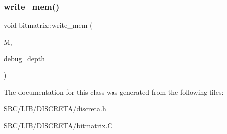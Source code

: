 \subsubsection{\texorpdfstring{write\+\_\+mem()}{write\_mem()}}
{\footnotesize\ttfamily void bitmatrix\+::write\+\_\+mem (\begin{DoxyParamCaption}\item[{\mbox{\hyperlink{classmemory}{memory}} \&}]{M,  }\item[{\mbox{\hyperlink{galois_8h_a09fddde158a3a20bd2dcadb609de11dc}{I\+NT}}}]{debug\+\_\+depth }\end{DoxyParamCaption})}



The documentation for this class was generated from the following files\+:\begin{DoxyCompactItemize}
\item 
S\+R\+C/\+L\+I\+B/\+D\+I\+S\+C\+R\+E\+T\+A/\mbox{\hyperlink{discreta_8h}{discreta.\+h}}\item 
S\+R\+C/\+L\+I\+B/\+D\+I\+S\+C\+R\+E\+T\+A/\mbox{\hyperlink{bitmatrix_8_c}{bitmatrix.\+C}}\end{DoxyCompactItemize}

